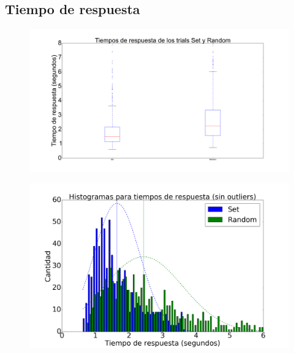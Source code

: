\documentclass{beamer}
\begin{document}
\subsection{Tiempo de respuesta}

\begin{frame}
\begin{figure}[h]
 \centering
  \begin{minipage}[c]{1\textwidth}
	\centering	
	\includegraphics[scale=0.22]{rt.png}
  \end{minipage}
\end{figure}
\end{frame}

\begin{frame}
\begin{figure}[c]
 \centering
  \begin{minipage}[c]{1\textwidth}
	\centering	
	\includegraphics[scale=0.22]{rt_hist.png}
  \end{minipage}
\end{figure}
\end{frame}
\end{document}
